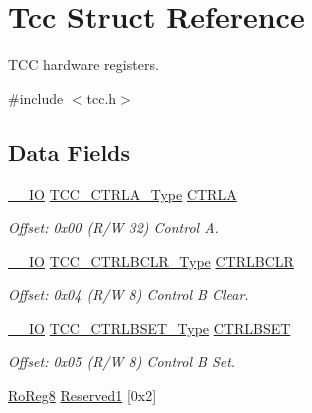 \hypertarget{struct_tcc}{}\section{Tcc Struct Reference}
\label{struct_tcc}


T\+CC hardware registers.  




{\ttfamily \#include $<$tcc.\+h$>$}

\subsection*{Data Fields}
\begin{DoxyCompactItemize}
\item 
\mbox{\hyperlink{core__cm0plus_8h_aec43007d9998a0a0e01faede4133d6be}{\+\_\+\+\_\+\+IO}} \mbox{\hyperlink{union_t_c_c___c_t_r_l_a___type}{T\+C\+C\+\_\+\+C\+T\+R\+L\+A\+\_\+\+Type}} \mbox{\hyperlink{struct_tcc_aa651e8406e628b45f41caf390b339049}{C\+T\+R\+LA}}
\begin{DoxyCompactList}\small\item\em Offset\+: 0x00 (R/W 32) Control A. \end{DoxyCompactList}\item 
\mbox{\hyperlink{core__cm0plus_8h_aec43007d9998a0a0e01faede4133d6be}{\+\_\+\+\_\+\+IO}} \mbox{\hyperlink{union_t_c_c___c_t_r_l_b_c_l_r___type}{T\+C\+C\+\_\+\+C\+T\+R\+L\+B\+C\+L\+R\+\_\+\+Type}} \mbox{\hyperlink{struct_tcc_acdcc7ad4d23d1ba99a7958f6216f9152}{C\+T\+R\+L\+B\+C\+LR}}
\begin{DoxyCompactList}\small\item\em Offset\+: 0x04 (R/W 8) Control B Clear. \end{DoxyCompactList}\item 
\mbox{\hyperlink{core__cm0plus_8h_aec43007d9998a0a0e01faede4133d6be}{\+\_\+\+\_\+\+IO}} \mbox{\hyperlink{union_t_c_c___c_t_r_l_b_s_e_t___type}{T\+C\+C\+\_\+\+C\+T\+R\+L\+B\+S\+E\+T\+\_\+\+Type}} \mbox{\hyperlink{struct_tcc_aa5b2b1748fa05c22acd1e9db0224b01f}{C\+T\+R\+L\+B\+S\+ET}}
\begin{DoxyCompactList}\small\item\em Offset\+: 0x05 (R/W 8) Control B Set. \end{DoxyCompactList}\item 
\mbox{\hyperlink{group___s_a_m_d21_e15_a__definitions_ga0d957f1433aaf5d70e4dc2b68288442d}{Ro\+Reg8}} \mbox{\hyperlink{struct_tcc_a4e5d6a915ea4537cf07dee3bb8de31b3}{Reserved1}} \mbox{[}0x2\mbox{]}
\item 

\end{DoxyCompactItemize}
